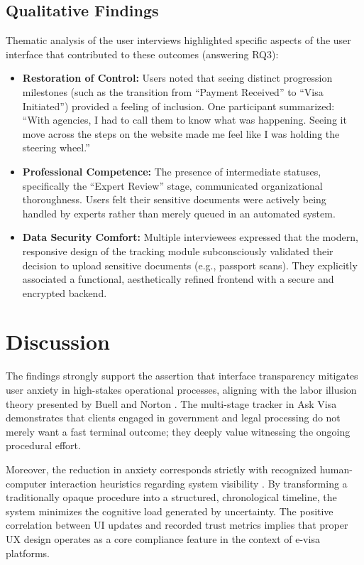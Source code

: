 \documentclass[journal, 10pt, twoside]{IEEEtran}
\begin{document}
\subsection{Qualitative Findings}
Thematic analysis of the user interviews highlighted specific aspects of the user interface that contributed to these outcomes (answering RQ3):
\begin{itemize}
    \item \textbf{Restoration of Control:} Users noted that seeing distinct progression milestones (such as the transition from ``Payment Received'' to ``Visa Initiated'') provided a feeling of inclusion. One participant summarized: ``With agencies, I had to call them to know what was happening. Seeing it move across the steps on the website made me feel like I was holding the steering wheel.''
    \item \textbf{Professional Competence:} The presence of intermediate statuses, specifically the ``Expert Review'' stage, communicated organizational thoroughness. Users felt their sensitive documents were actively being handled by experts rather than merely queued in an automated system.
    \item \textbf{Data Security Comfort:} Multiple interviewees expressed that the modern, responsive design of the tracking module subconsciously validated their decision to upload sensitive documents (e.g., passport scans). They explicitly associated a functional, aesthetically refined frontend with a secure and encrypted backend.
\end{itemize}

\section{Discussion}
\label{sec:discussion}

The findings strongly support the assertion that interface transparency mitigates user anxiety in high-stakes operational processes, aligning with the labor illusion theory presented by Buell and Norton \cite{buell2011}. The multi-stage tracker in Ask Visa demonstrates that clients engaged in government and legal processing do not merely want a fast terminal outcome; they deeply value witnessing the ongoing procedural effort.

Moreover, the reduction in anxiety corresponds strictly with recognized human-computer interaction heuristics regarding system visibility \cite{nielsen1994}. By transforming a traditionally opaque procedure into a structured, chronological timeline, the system minimizes the cognitive load generated by uncertainty. The positive correlation between UI updates and recorded trust metrics implies that proper UX design operates as a core compliance feature in the context of e-visa platforms.
\end{document}
